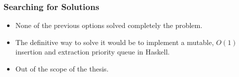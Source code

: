 \documentclass{beamer}
\begin{document}
\begin{frame}
  \frametitle{Searching for Solutions}
  \begin{itemize}
  \item None of the previous options solved completely the problem.
  \item The definitive way to solve it would be to implement a mutable, $O(1)$
    insertion and extraction priority queue in Haskell.
  \item Out of the scope of the thesis.
  \end{itemize}
\end{frame}
\end{document}
